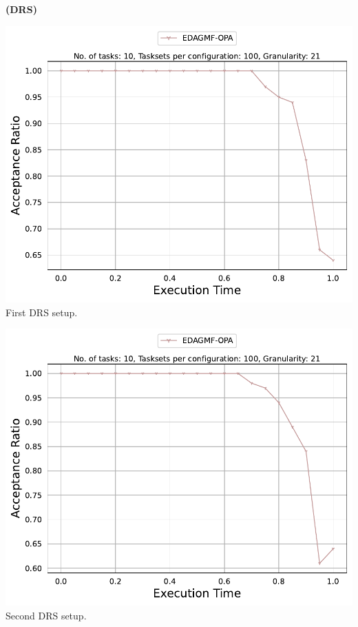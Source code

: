 \documentclass[]{article}
\begin{document}
	\begin{minipage}[t]{0.48\linewidth}
		\centering
		\textbf{(DRS)}
		\vspace{0.3cm}
		
		\includegraphics[width=\linewidth]{EDAGMF-OPA[21][0.01-0.1][10].pdf}
		First DRS setup.
		\vspace{0.3cm}
		
		\includegraphics[width=\linewidth]{EDAGMF-OPA_2nd.pdf}
		Second DRS setup.
		\vspace{0.3cm}


\end{minipage}
\end{document}

